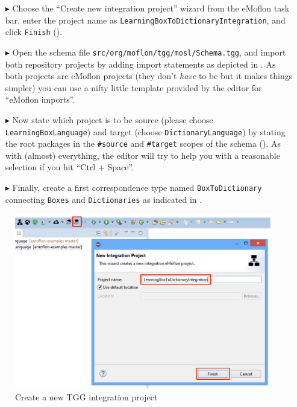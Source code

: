 \begin{itemize}

\item[$\blacktriangleright$] Choose the ``Create new integration project'' wizard from the eMoflon task bar, enter the project name as
\texttt{Learning\-Box\-To\-Dictionary\-In\-te\-gra\-tion}, and click \texttt{Finish} ().

\item[$\blacktriangleright$] Open the schema file \texttt{src/org/moflon/tgg/mosl/Schema.tgg}, and import both repository projects by adding import statements as depicted in .
As both projects are eMoflon projects (they don't \emph{have} to be but it makes things simpler) you can use a nifty little template provided by the editor for ``eMoflon imports''.

\item[$\blacktriangleright$] Now state which project is to be source (please choose \texttt{Learning\-Box\-Language}) and target (choose \texttt{Dictionary\-Language}) by stating the root packages in the \texttt{\#source} and \texttt{\#target} scopes of the schema ().
As with (almost) everything, the editor will try to help you with a reasonable selection if you hit ``Ctrl + Space''. 

\item[$\blacktriangleright$] Finally, create a first correspondence type named \texttt{BoxToDictionary} connecting \texttt{Boxes} and \texttt{Dictionaries} as indicated in .
\end{itemize}

\begin{figure}[htbp]
\begin{center}
  \includegraphics[width=\textwidth]{newIntegrationProject}
  \caption{Create a new TGG integration project}  
  \label{intgPackage}
\end{center}
\end{figure}

